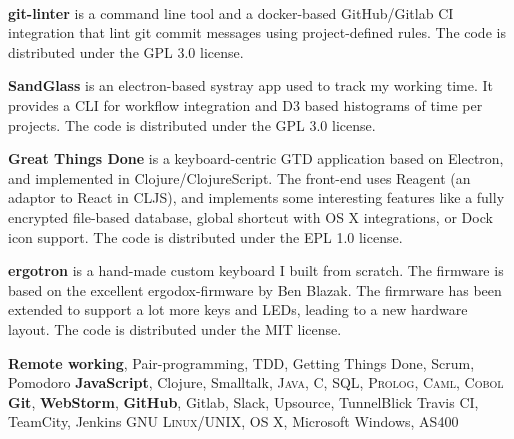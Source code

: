 \begin{rubric}{
}
\medskip\\

 \textbf{git-linter} is a command line tool and a docker-based GitHub/Gitlab CI integration that lint git commit messages using project-defined rules. The code is distributed under the GPL 3.0 license.

\entry*[SandGlass] \textbf{SandGlass} is an electron-based systray app used to track my working time. It provides a CLI for workflow integration and D3 based histograms of time per projects. The code is distributed under the GPL 3.0 license.

 \textbf{Great Things Done} is a keyboard-centric GTD application based on Electron, and implemented in \mbox{Clojure/ClojureScript}. The front-end uses Reagent (an adaptor to React in CLJS), and implements some interesting features like a fully encrypted file-based database, global shortcut with OS X integrations, or Dock icon support. The code is distributed under the EPL 1.0 license.


 \textbf{ergotron} is a hand-made custom keyboard I built from scratch. The firmware is based on the excellent ergodox-firmware by Ben Blazak. The firmrware has been extended to support a lot more keys and LEDs, leading to a new hardware layout. The code is distributed under the MIT license.


\entry*[Agile] \textbf{Remote working}, Pair-programming, TDD, Getting Things Done, Scrum, Pomodoro
\entry*[Programming] \textbf{JavaScript}, Clojure, Smalltalk, \textsc{Java}, C, \textsc{SQL}, \textsc{Prolog}, \textsc{Caml}, \textsc{Cobol}
\entry*[Software] \textbf{Git}, \textbf{WebStorm}, \textbf{GitHub}, Gitlab, Slack, Upsource, TunnelBlick
 Travis CI, TeamCity, Jenkins
\entry*[System] \textsc{GNU Linux/UNIX}, OS X, Microsoft Windows, AS400


\end{rubric}
